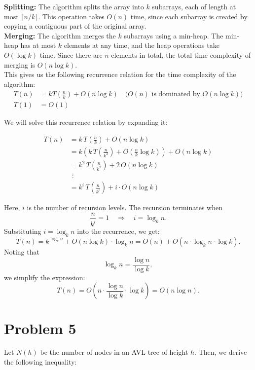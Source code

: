 \documentclass[a4paper]{article}
\begin{document}
\noindent \textbf{Splitting:} The algorithm splits the array into $k$ subarrays, each of length at most $\lceil n/k \rceil$. This operation takes $O(n)$ time, since each subarray is created by copying a contiguous part of the original array. \\

\noindent \textbf{Merging:} The algorithm merges the $k$ subarrays using a min-heap. The min-heap has at most $k$ elements at any time, and the heap operations take $O(\log k)$ time. Since there are $n$ elements in total, the total time complexity of merging is $O(n \log k)$. \\

\noindent This gives us the following recurrence relation for the time complexity of the algorithm:
\begin{align*}
    T(n) &= k T\left(\frac{n}{k} \right) + O(n \log k) \quad \text{($O(n)$ is dominated by $O(n \log k)$)} \\
    T(1) &= O(1)
\end{align*}

\noindent We will solve this recurrence relation by expanding it:

\begin{align*}
    T(n) &= k\, T\left(\frac{n}{k}\right) + O(n \log k) \\
         &= k\left( k\, T\left(\frac{n}{k^2}\right) + O\left(\frac{n}{k}\log k\right) \right) + O(n \log k) \\
         &= k^2\, T\left(\frac{n}{k^2}\right) + 2\, O(n \log k) \\
         &\ \, \vdots \\
         &= k^{i}\, T\left(\frac{n}{k^{i}}\right) + i \cdot O(n \log k)
\end{align*}

Here, $i$ is the number of recursion levels. The recursion terminates when
\[
\frac{n}{k^{i}} = 1 \quad \Longrightarrow \quad i = \log_k n.
\]
Substituting $i = \log_k n$ into the recurrence, we get:
\[
T(n) = k^{\log_k{n}} + O(n \log k) \cdot \log_k n = O(n) + O\left( n \cdot \log_k n \cdot \log k \right).
\]
Noting that
\[
\log_k n = \frac{\log n}{\log k},
\]
we simplify the expression:
\[
T(n) = O\left( n \cdot \frac{\log n}{\log k} \cdot \log k \right) = O(n \log n).
\]


\newpage
\section*{Problem 5}
Let $N(h)$ be the number of nodes in an AVL tree of height $h$. Then, we derive the following inequality:
\end{document}

